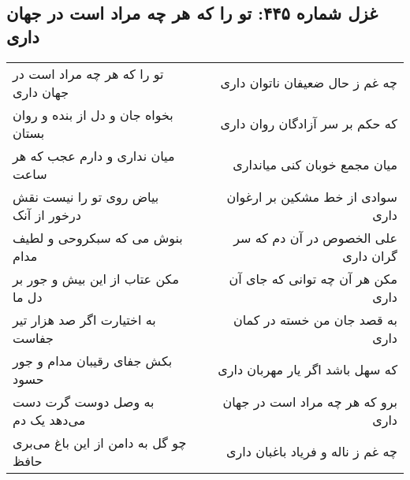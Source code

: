 \begin{center}
\section*{غزل شماره ۴۴۵: تو را که هر چه مراد است در جهان داری}
\label{sec:sh445}
\begin{longtable}{l p{0.5cm} r}
تو را که هر چه مراد است در جهان داری
&&
چه غم ز حال ضعیفان ناتوان داری
\\
بخواه جان و دل از بنده و روان بستان
&&
که حکم بر سر آزادگان روان داری
\\
میان نداری و دارم عجب که هر ساعت
&&
میان مجمع خوبان کنی میانداری
\\
بیاض روی تو را نیست نقش درخور از آنک
&&
سوادی از خط مشکین بر ارغوان داری
\\
بنوش می که سبکروحی و لطیف مدام
&&
علی الخصوص در آن دم که سر گران داری
\\
مکن عتاب از این بیش و جور بر دل ما
&&
مکن هر آن چه توانی که جای آن داری
\\
به اختیارت اگر صد هزار تیر جفاست
&&
به قصد جان من خسته در کمان داری
\\
بکش جفای رقیبان مدام و جور حسود
&&
که سهل باشد اگر یار مهربان داری
\\
به وصل دوست گرت دست می‌دهد یک دم
&&
برو که هر چه مراد است در جهان داری
\\
چو گل به دامن از این باغ می‌بری حافظ
&&
چه غم ز ناله و فریاد باغبان داری
\\
\end{longtable}
\end{center}
